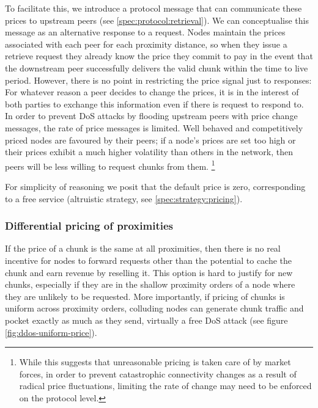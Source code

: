 To facilitate this, we introduce a protocol message that can communicate these prices to upstream peers (see \ref{spec:protocol:retrieval}). We can conceptualise this message as an alternative response to a request. Nodes maintain the prices associated with each peer for each proximity distance, so when they issue a retrieve request they already know the price they commit to pay in the event that the downstream peer successfully delivers the valid chunk within the time to live period. However, there is no point in restricting the price signal just to responses: For whatever reason a peer decides to change the prices, it is in the interest of both parties to exchange this information even if there is request to respond to. In order to prevent DoS attacks by flooding upstream peers with price change messages, the rate of price messages is limited. Well behaved and competitively priced nodes are favoured by their peers; if a node's prices are set too high or their prices exhibit a much higher volatility than others in the network, then peers will be less willing to request chunks from them.%
%
\footnote{While this suggests that unreasonable pricing is taken care of by market forces, in order to prevent catastrophic connectivity changes as a result of radical price fluctuations, limiting the rate of change may need to be enforced on the protocol level. }

For simplicity of reasoning we posit that the default price is zero, corresponding to a free service (altruistic strategy, see \ref{spec:strategy:pricing}). 

\subsubsection{Differential pricing of proximities}\label{sec:diff-pricing-prox}

If the price of a chunk is the same at all proximities, then there is no real incentive for nodes to forward requests other than the potential to cache the chunk and earn revenue by reselling it. This option is hard to justify for new chunks, especially if they are in the shallow proximity orders of a node where they are unlikely to be requested. More importantly, if pricing of chunks is uniform across proximity orders, colluding nodes can generate chunk traffic and pocket exactly as much as they send, virtually a free DoS attack (see figure \ref{fig:ddos-uniform-price}).

